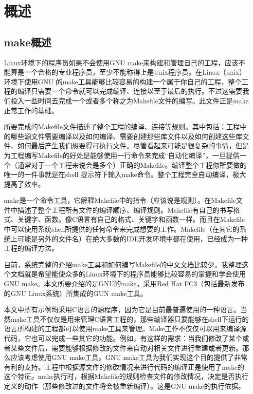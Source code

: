 ﻿\chapter{概述}

\section{make概述}

Linux环境下的程序员如果不会使用GNU make来构建和管理自己的工程，应该不能算是一个合格的专业程序员，至少不能称得上是Unix程序员。在Linux（unix）环境下使用GNU 的make工具能够比较容易的构建一个属于你自己的工程，整个工程的编译只需要一个命令就可以完成编译、连接以至于最后的执行。不过这需要我们投入一些时间去完成一个或者多个称之为Makefile文件的编写。此文件正是make正常工作的基础。

所要完成的Makefile文件描述了整个工程的编译、连接等规则。其中包括：工程中的哪些源文件需要编译以及如何编译、需要创建那些库文件以及如何创建这些库文件、如何最后产生我们想要得可执行文件。尽管看起来可能是很复杂的事情，但是为工程编写Makefile的好处是能够使用一行命令来完成“自动化编译”，一旦提供一个（通常对于一个工程来说会是多个）正确的Makefile。编译整个工程你所要做的唯一的一件事就是在shell 提示符下输入make命令。整个工程完全自动编译，极大提高了效率。

make是一个命令工具，它解释Makefile中的指令（应该说是规则）。在Makefile文件中描述了整个工程所有文件的编译顺序、编译规则。Makefile有自己的书写格式、关键字、函数。像C语言有自己的格式、关键字和函数一样。而且在Makefile中可以使用系统shell所提供的任何命令来完成想要的工作。Makefile（在其它的系统上可能是另外的文件名）在绝大多数的IDE开发环境中都在使用，已经成为一种工程的编译方法。

目前，系统完整的介绍make工具和如何编写Makefile的中文文档比较少。我整理这个文档就是希望能使众多的Linux环境下的程序员能够比较容易的掌握和学会使用GNU make。本文所要介绍的是GNU的make，采用Red Hat FC3（包括最新发布的GNU Linux系统）所集成的GUN make工具。


本文中所有示例均采用C语言的源程序，因为它是目前最普遍使用的一种语言。当然make工具不仅仅是用来管理C语言工程的，那些编译器只要能够在shell下运行的语言所构建的工程都可以使用make工具来管理。Make工作不仅仅可以用来编译源代码，它也可以完成一些其它的功能。例如，有这样的需求：当我们修改了某个或者某些文件后，需要能够根据修改的文件来自动对相关文件进行重建或者更新。那么应该考虑使用GNU make工具。GNU make工具为我们实现这个目的提供了非常有利的支持。工程中根据源文件的修改情况来进行代码的编译正是使用了make的这个特征。make执行时，根据Makefile的规则检查文件的修改情况，决定是否执行定义的动作（那些修改过的文件将会被重新编译）。这是GNU make的执行依据。

